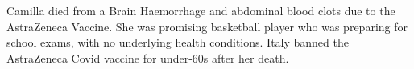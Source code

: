 Camilla died from a Brain Haemorrhage and abdominal blood clots due to the
AstraZeneca Vaccine. She was promising basketball player who was preparing for
school exams, with no underlying health conditions. Italy banned the AstraZeneca
Covid vaccine for under-60s after her death.


